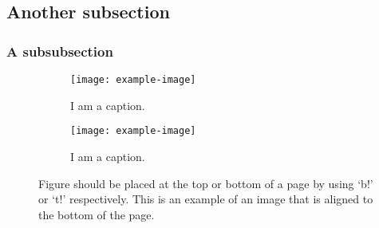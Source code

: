 \subsection{Another subsection}

\lipsum[5]

\subsubsection{A subsubsection}

\begin{figure}[b!]
\centering
\begin{subfigure}{.48\textwidth}
  \centering
  \texttt{[image: example-image]}
  \caption{I am a caption.}
  \label{fig:a}
\end{subfigure}%
\hfill
\begin{subfigure}{.48\textwidth}
  \centering
  \texttt{[image: example-image]}
  \caption{I am a caption.}
  \label{fig:b}
\end{subfigure}
\caption{Figure should be placed at the top or bottom of a page by using `b!' or `t!' respectively. This is an example of an image that is aligned to the bottom of the page.}
\label{fig:backprop_asymbackprop}
\end{figure}

\lipsum[8] \\

\lipsum[10] \\

\lipsum[12] \\

\lipsum[14]